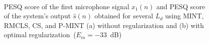 \documentclass[10pt]{IEEEtran}
\begin{document}
\begin{figure}[b!]
  \centering
  \hbox{
    \hspace{2cm}
    }
  \caption{PESQ score of the first microphone signal $x_1(n)$ and PESQ score of the system's output $\hat{s}(n)$ obtained for several $L_d$ using MINT, RMCLS, CS, and P-MINT (a) without regularization and (b) with optimal regularization~($E_m = -33$~dB)}
\end{figure}
\end{document}
